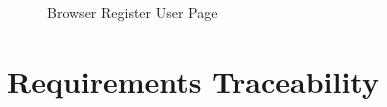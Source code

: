 \documentclass[a4paper]{article}
\begin{document}
\begin {itemize}
\begin{figure}[h]
\noindent{}%
\caption {Browser Register User Page}
\vspace*{0.2cm}
\end{figure}
\end{itemize}


\newpage
\section{Requirements Traceability}
\end{document}
